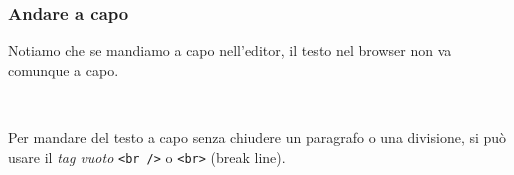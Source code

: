 \documentclass[]{beamer}
\begin{document}
\begin{frame}[fragile]
\frametitle{Andare a capo}
Notiamo che se mandiamo a capo nell'editor, il testo nel browser non va comunque a capo.

~

Per mandare del testo a capo \alert{senza chiudere un paragrafo o una divisione}, si può usare il \emph{tag vuoto} \texttt{<br />} o \texttt{<br>} (break line).\pause

\end{frame}
\end{document}
